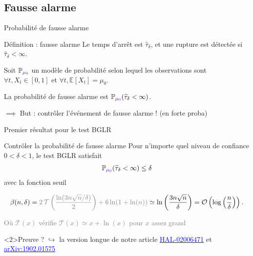 \documentclass[11pt,french,ignorenonframetext,]{beamer}
\begin{document}
\subsection{\hfill{}Fausse alarme\hfill{}}

\begin{frame}{Probabilité de fausse alarme}


  \begin{block}{Définition : fausse alarme}
    Le temps d'arrêt est $\widehat{\tau}_\delta$,
    et une rupture est détectée si $\widehat{\tau}_\delta < \infty$.

    Soit $\mathbb{P}_{\textcolor{deeppurple}{\mu_0}}$ un modèle de probabilité selon lequel les observations sont $\forall t, X_t \in[0,1]$
    et \textcolor{deeppurple}{$\forall t, \mathbb{E}[X_t] = \mu_0$}.

    La \alert{probabilité de fausse alarme} est $\mathbb{P}_{\textcolor{deeppurple}{\mu_0}}(\widehat{\tau}_\delta < \infty)$.
  \end{block}

  \alert{$\implies$ But : contrôler l'événement de fausse alarme !} (en forte proba)

\end{frame}

\begin{frame}{Premier résultat pour le test BGLR \dSmiley{}}

  \begin{block}{Contrôler la probabilité de fausse alarme}
    Pour n'importe quel \alert{niveau de confiance} $0<\delta<1$,
    le test BGLR satisfait
    \[ \mathbb{P}_{\textcolor{deeppurple}{\mu_0}}(\widehat{\tau}_\delta < \infty) \leq \delta \]
    avec la fonction seuil
    \begin{small}
      \[ \beta(n,\delta) = \textcolor{gray}{2\,\mathcal{T}\left(\frac{\ln(3n\sqrt{n}/\delta)}{2}\right) + 6\ln(1+\ln(n))} \simeq \ln\left(\frac{3n \sqrt{n}}{\delta}\right) = \mathcal{O}\left(\log\left(\frac{n}{\delta}\right)\right).\]
    \end{small}
    \begin{footnotesize}
      \textcolor{gray}{Où $\mathcal{T}(x)$ vérifie $\mathcal{T}(x)\simeq x + \ln(x)$ pour $x$ assez grand}
    \end{footnotesize}
  \end{block}

  \begin{small}
    \begin{exampleblock}<2>{Preuve ?}
      $\hookrightarrow$ la version longue de notre article
      \href{https://hal.inria.fr/hal-02006471}{\textcolor{blue}{HAL-02006471}}
      et
      \href{https://arxiv.org/abs/1902.01575}{\textcolor{blue}{arXiv:1902.01575}}
    \end{exampleblock}
  \end{small}

\end{frame}
\end{document}
